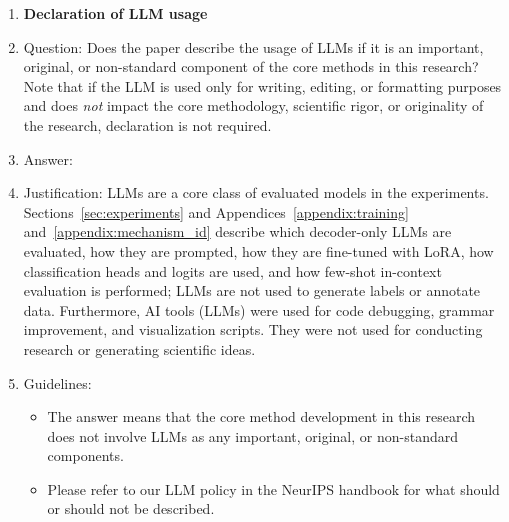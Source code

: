 \documentclass{article}
\theoremstyle{plain}
\theoremstyle{definition}
\theoremstyle{remark}
\begin{document}
\begin{enumerate}
\item {\bf Declaration of LLM usage}
    \item[] Question: Does the paper describe the usage of LLMs if it is an important, original, or non-standard component of the core methods in this research? Note that if the LLM is used only for writing, editing, or formatting purposes and does \emph{not} impact the core methodology, scientific rigor, or originality of the research, declaration is not required.
    \item[] Answer: \answerYes{}
    \item[] Justification: LLMs are a core class of evaluated models in the experiments. Sections~\ref{sec:experiments} and Appendices~\ref{appendix:training} and~\ref{appendix:mechanism_id} describe which decoder-only LLMs are evaluated, how they are prompted, how they are fine-tuned with LoRA, how classification heads and logits are used, and how few-shot in-context evaluation is performed; LLMs are not used to generate labels or annotate data. Furthermore, AI tools (LLMs) were used for code debugging, grammar improvement, and visualization scripts. They were not used for conducting research or generating scientific ideas.
    \item[] Guidelines:
    \begin{itemize}
        \item The answer \answerNA{} means that the core method development in this research does not involve LLMs as any important, original, or non-standard components.
        \item Please refer to our LLM policy in the NeurIPS handbook for what should or should not be described.
    \end{itemize}

\end{enumerate}
\end{document}
